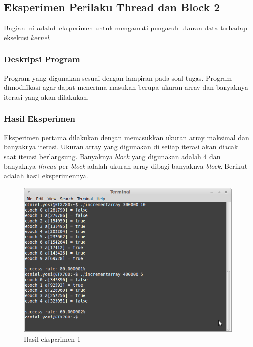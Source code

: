 \subsection{Eksperimen Perilaku Thread dan Block 2} 

Bagian ini adalah eksperimen untuk mengamati pengaruh ukuran data terhadap eksekusi \textit{kernel}.

\subsubsection{Deskripsi Program}

Program yang digunakan sesuai dengan lampiran pada soal tugas.  Program dimodifikasi agar dapat menerima masukan berupa ukuran array dan banyaknya iterasi yang akan dilakukan.

\subsubsection{Hasil Eksperimen}

Eksperimen pertama dilakukan dengan memasukkan ukuran array maksimal dan banyaknya iterasi.  Ukuran array yang digunakan di setiap iterasi akan diacak saat iterasi berlangsung.  Banyaknya \textit{block} yang digunakan adalah 4 dan banyaknya \textit{thread} per \textit{block} adalah ukuran array dibagi banyaknya \textit{block}.  Berikut adalah hasil eksperimennya.

\begin{figure}
	\centering
	\includegraphics[width=1\textwidth]
	{pics/incrementarray}
	\caption{Hasil eksperimen 1}
	\label{fig:inc_demo1}
\end{figure}

